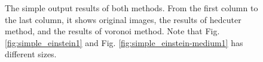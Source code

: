 \documentclass[11pt]{article}
\begin{document}
\begin{figure}[bt]
{    \label{fig:simple_fairyeyes2}
  }\hspace{-3mm}
  \caption{The simple output results of both methods. From the first column to the last column, it shows original images, the results of hedcuter method, and the results of voronoi method. Note that Fig. \ref{fig:simple_einstein1} and Fig. \ref{fig:simple_einstein-medium1} has different sizes. \label{fig:simple_results1}}
\end{figure}
\end{document}
